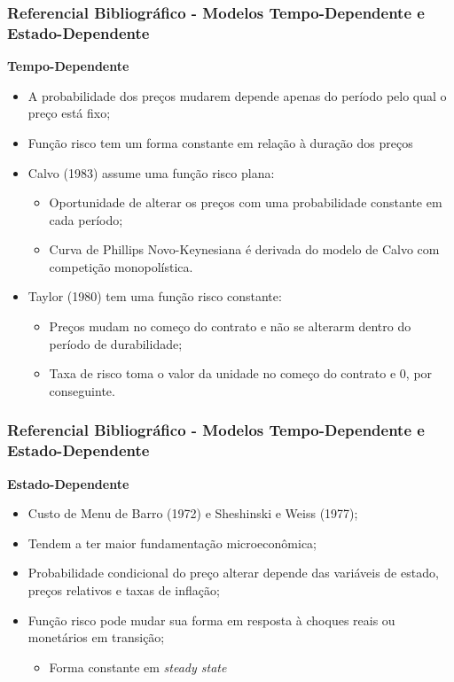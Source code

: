 \documentclass[aspectratio=169]{beamer}
\begin{document}
\begin{frame}\frametitle{Referencial Bibliográfico - Modelos Tempo-Dependente e Estado-Dependente}
\textbf{Tempo-Dependente}
  \begin{itemize}
  \item A probabilidade dos preços mudarem depende apenas do período pelo qual o preço está fixo;
  \item Função risco tem um forma constante em relação à duração dos preços
  \item Calvo (1983) assume uma função risco plana:
    \begin{itemize}
    \item Oportunidade de alterar os preços com uma probabilidade constante em cada período;
    \item Curva de Phillips Novo-Keynesiana é derivada do modelo de Calvo com competição monopolística.
    \end{itemize}
  \item Taylor (1980) tem uma função risco constante:
    \begin{itemize}
    \item Preços mudam no começo do contrato e não se alterarm dentro do período de durabilidade;
    \item Taxa de risco toma o valor da unidade no começo do contrato e 0, por conseguinte. 
    \end{itemize}
  \end{itemize}
\end{frame}

\begin{frame}\frametitle{Referencial Bibliográfico - Modelos Tempo-Dependente e Estado-Dependente}
\textbf{Estado-Dependente}
  \begin{itemize}
  \item Custo de Menu de Barro (1972) e Sheshinski e Weiss (1977);
  \item Tendem a ter maior fundamentação microeconômica;
  \item Probabilidade condicional do preço alterar depende das variáveis de estado, preços relativos e taxas de inflação;
  \item Função risco pode mudar sua forma em resposta à choques reais ou monetários em transição;
    \begin{itemize}
    \item Forma constante em \emph{steady state}
    \end{itemize}
  \end{itemize}
\end{frame}
\end{document}
